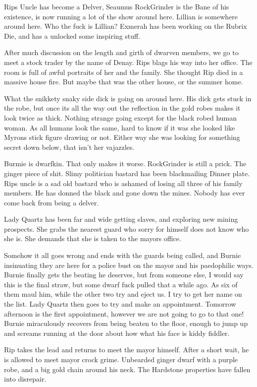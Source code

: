 Rips Uncle has become a Delver, Seaumus RockGrinder is the Bane of his existence, is now running a lot of the show around here. Lillian is somewhere around here. Who the fuck is Lillian? Exmerah has been working on the Rubrix Die, and has a unlocked some inspiring stuff.\medskip

After much discussion on the length and girth of dwarven members, we go to meet a stock trader by the name of Denay. Rips blags his way into her office. The room is full of awful portraits of her and the family. She thought Rip died in a massive house fire. But maybe that was the other house, or the summer home.\medskip

What the snikkety snaky side dick is going on around here. His dick gets stuck in the robe, but once its all the way out the reflection in the gold robes makes it look twice as thick. Nothing strange going except for the black robed human woman. As all humans look the same, hard to know if it was she looked like Myrons stick figure drawing or not. Either way she was looking for something secret down below, that isn’t her vajazzles.\medskip

Burmie is dwarfkin. That only makes it worse. RockGrinder is still a prick. The ginger piece of shit. Slimy politician bastard has been blackmailing Dinner plate. Rips uncle is a sad old bastard who is ashamed of losing all three of his family members. He has donned the black and gone down the mines. Nobody has ever come back from being a delver.\medskip

Lady Quartz has been far and wide getting slaves, and exploring new mining prospects. She grabs the nearest guard who sorry for himself does not know who she is. She demands that she is taken to the mayors office.\medskip

Somehow it all goes wrong and ends with the guards being called, and Burnie insinuating they are here for a police bust on the mayor and his paedophilic ways. Burnie finally gets the beating he deserves, but from someone else, I would say this is the final straw, but some dwarf fuck pulled that a while ago. As six of them maul him, while the other two try and eject us. I try to get her name on the list. Lady Quartz then goes to try and make an appointment. Tomorrow afternoon is the first appointment, however we are not going to go to that one! Burnie miraculously recovers from being beaten to the floor, enough to jump up and screams running at the door about how what his face is kiddy fiddler.\medskip

Rip takes the lead and returns to meet the mayor himself. After a short wait, he is allowed to meet mayor crock grime. Unbearded ginger dwarf with a purple robe, and a big gold chain around his neck. The Hardstone properties have fallen into disrepair.\medskip

